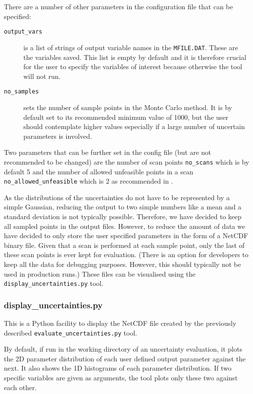 \documentclass[10pt,a4paper]{article}
\newcommand{\mfile}{\mbox{\texttt{MFILE.DAT}}}
\begin{document}
There are a number of other parameters in the configuration file that can be specified:
\begin{description}
\item[\texttt{output\_vars}] is a list of strings of output variable names in the \mfile. These are the variables saved. This list is empty by default and it is therefore crucial for the user to specify the variables of interest because otherwise the tool will not run. 
\item[\texttt{no\_samples}] sets the number of sample points in the Monte Carlo method. It is by default set to its recommended minimum value of 1000, but the user should contemplate higher values especially if a large number of uncertain parameters is involved.
\end{description}
 Two parameters that can be further set in the config file (but are not recommended to be changed) are the number of scan points \texttt{no\_scans} which is by default 5 and the number of allowed unfeasible points in a scan \texttt{no\_allowed\_unfeasible} which is 2 as recommended in \cite{WPPMI2014Report}.
 

As the distributions of the uncertainties do not have to be represented by a simple Gaussian, reducing the output to two simple numbers like a mean and a standard deviation is not typically possible. Therefore, we have decided to keep all sampled points in the output files. However, to reduce the amount of data we have decided to only store the user specified parameters in the form of a NetCDF binary file. Given that a scan is performed at each sample point, only the last of these scan points is ever kept for evaluation. (There is an option for developers to keep all the data for debugging purposes. However, this should typically not be used in production runs.) These files can be visualised using the \texttt{display\_uncertainties.py} tool. 


\subsubsection{display\_uncertainties.py}
This is a Python facility to display the NetCDF file created by the previously described \texttt{evaluate\_uncertainties.py} tool. 

By default, if run in the working directory of an uncertainty evaluation, it plots the 2D parameter distribution of each user defined output parameter against the next. It also shows the 1D histograms of each parameter distribution. If two specific variables are given as arguments, the tool plots only these two against each other.
\end{document}
